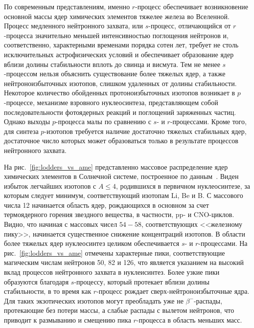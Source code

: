 По современным представлениям, именно $r$-процесс обеспечивает возникновение основной массы ядер химических элементов тяжелее железа во Вселенной. Процесс медленного нейтронного захвата, или $s$-процесс, отличающийся от $r$-процесса значительно меньшей интенсивностью поглощения нейтронов и, соответственно, характерными временами порядка сотен лет, требует не столь исключительных астрофизических условий и обеспечивает образование ядер вблизи долины стабильности вплоть до свинца и висмута. Тем не менее $s$-процессом нельзя объяснить существование более тяжелых ядер, а также нейтроноизбыточных изотопов, слишком удаленных от долины стабильности. Некоторое количество обойденных протоноизбыточных изотопов возникает в $p$-процессе, механизме взровного нуклеосинтеза, представляющем собой последовательности фотоядерных реакций и поглощений заряженных частиц. Однако выходы $p$-процесса малы по сравнению с $s$- и $r$-процессами. Кроме того, для синтеза $p$-изотопов требуется наличие достаточно тяжелых стабильных ядер, достаточное число которых может образоваться только в результате процессов нейтронного захвата. 

На рис.~\ref{fig:lodders_vs_ame} представленно массовое распределение ядер химических элементов в Солнечной системе, построенное по данным~\cite{lodders2003}. Виден избыток легчайших изотопов с $A \leq 4$, родившихся в первичном нуклеосинтезе, за которым следует минимум, соответствующий изотопам Li, Be и B. С массового числа 12 начинается область ядер, рождающихся в основном за счет термоядерного горения звездного вещества, в частности, pp- и CNO-циклов. Видно, что начиная с массовых чисел $54 - 58$, соответствующих <<железному пику>>, начинается существенное снижение концентраций изотопов. В области более тяжелых ядер нуклеосинтез целиком обеспечивается $s$- и $r$-процессами. На рис.~\ref{fig:lodders_vs_ame} отмечены характерные пики, соответствующие магическим числам нейтронов 50, 82 и 126, что является указанием на высокий вклад процессов нейтронного захвата в нуклеисинтез. Более узкие пики образуются благодаря $s$-процессу, который протекает вблизи долины стабильности, в то время как $r$-процесс рождает сверх-нейтроноизбыточные ядра. Для таких экзотических изотопов могут преобладать уже не $\beta^-$-распады, протекающие без потери массы, а слабые распады с вылетом нейтронов, что приводит к размыванию и смещению пика $r$-процесса в область меньших масс.

